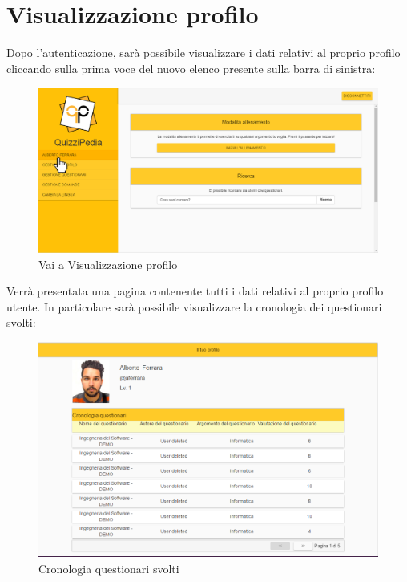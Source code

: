 \newpage
\section{Visualizzazione profilo}
Dopo l'autenticazione, sarà possibile visualizzare i dati relativi al proprio profilo cliccando sulla prima voce del nuovo elenco presente sulla barra di sinistra:

\label{VaiProfilo}
\begin{figure}[ht]
	\centering
	\includegraphics[scale=0.33]{img/vai_profilo.png}
	\caption{Vai a Visualizzazione profilo}
\end{figure}
\FloatBarrier

\newpage
Verrà presentata una pagina contenente tutti i dati relativi al proprio profilo utente. In particolare sarà possibile visualizzare la cronologia dei questionari svolti:

\label{CronologiaQuestionari}
\begin{figure}[ht]
	\centering
	\includegraphics[scale=0.45]{img/cronologia_questionari.png}
	\caption{Cronologia questionari svolti}
\end{figure}
\FloatBarrier

